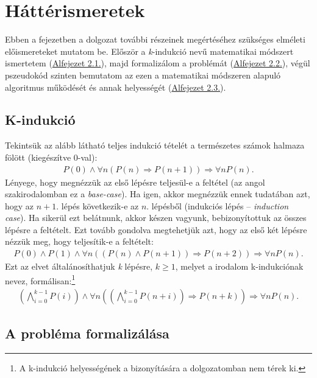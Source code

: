 \chapter{Háttérismeretek}

Ebben a fejezetben a dolgozat további részeinek megértéséhez szükséges elméleti előismereteket mutatom be. Először a \emph{k}-indukció nevű matematikai módszert \cite{k_induction_principle} ismertetem (\hyperlink{section.2.1}{Alfejezet 2.1.}), majd formalizálom a problémát (\hyperlink{section.2.2}{Alfejezet 2.2.}), végül pszeudokód szinten bemutatom az ezen a matematikai módszeren alapuló algoritmus működését és annak helyességét (\hyperlink{section.2.3}{Alfejezet 2.3.}).

\section{K-indukció}

Tekintsük az alább látható teljes indukció tételét a természetes számok halmaza fölött (kiegészítve 0-val): 
\begin{align}
	P(0) \wedge \forall n (P(n) \Rightarrow P(n+1)) \Rightarrow \forall nP(n).
\end{align}
Lényege, hogy megnézzük az első lépésre teljesül-e a feltétel (az angol szakirodalomban ez a \emph{base-case}). Ha igen, akkor megnézzük ennek tudatában azt, hogy az $n+1$. lépés következik-e az $n$. lépésből (indukciós lépés -- \emph{induction case}). Ha sikerül ezt belátnunk, akkor készen vagyunk, bebizonyítottuk az összes lépésre a feltételt.
\newline
\newline
Ezt tovább gondolva megtehetjük azt, hogy az első két lépésre nézzük meg, hogy teljesítik-e a feltételt:
\begin{align}
	P(0) \wedge P(1) \wedge \forall n ((P(n) \wedge P(n+1)) \Rightarrow P(n+2) ) \Rightarrow \forall n P(n).
\end{align}
Ezt az elvet általánosíthatjuk \emph{k} lépésre, $k \geq 1$, melyet a irodalom \cite{k_induction_principle} k-indukciónak nevez, formálisan:\footnote{A k-indukció helyességének a bizonyítására a dolgozatomban nem térek ki.}
\begin{align}
	\left( \bigwedge_{i=0}^{k-1} P(i) \right) \wedge \forall n \left( \left( \bigwedge_{i=0}^{k-1} P(n+i) \right) \Rightarrow P(n+k) \right) \Rightarrow \forall n P(n).
\end{align}

\section{A probléma formalizálása}

